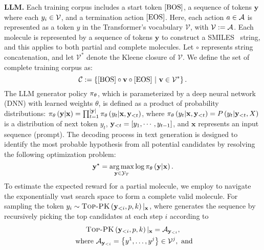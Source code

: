 {

\textbf{LLM.}
Each training corpus includes a start token $\left[\text{BOS}\right]$, a sequence of tokens $\mathbf{y}$ where each $y_i \in \mathcal{V}$, and a termination action $\left[\text{EOS}\right]$. Here, each action $a \in \mathcal{A}$ is represented as a token $y$ in the Transformer's vocabulary $\mathcal{V}$, with $\mathcal{V} := \mathcal{A}$. Each molecule is represented by a sequence of tokens $\mathbf{y}$ to construct a SMILES~\citep{weininger1988smiles} string, and this applies to both partial and complete molecules.
Let  $\circ$ represents string concatenation, and let $\mathcal{V}^*$ denote the Kleene closure of $\mathcal{V}$.
We define the set of complete training corpus as: 
\begin{equation}
    \mathcal{C} := \left\{\text{[BOS]} \circ \mathbf{v} \circ \text{[EOS]}~|~\mathbf{v}\in \mathcal{V}^*\right\}.
\end{equation}
The LLM generator policy $\pi_{\theta}$, which is parameterized by a deep neural network (DNN) with learned weights $\theta$, is defined as a product of probability distributions:
$\pi_{\theta} \left( {\mathbf{y}|\mathbf{x}} \right) =\prod_{t=1}^{|\mathbf{y}|} \pi_{\theta} \left( {y_t|\mathbf{x},\mathbf{y}_{<t}} \right) $, where  $\pi_{\theta} \left( {y_t|\mathbf{x},\mathbf{y}_{<t}} \right) =P \left( {y_{t}|\mathbf{y}_{<t},X} \right) $ is a distribution of next token $y_t$, $\mathbf{y}_{<t} = \left[y_1, \cdots, y_{t-1}\right]$, and $\mathbf{x}$ represents an input sequence (prompt).
The decoding process in text generation is designed to identify the most probable hypothesis from all potential candidates by resolving the following optimization problem:
\begin{equation}
\mathbf{y}^{\star}=\mathop{\rm arg\,max}_{\mathbf{y}\in \mathcal{Y}_{T}} \log \pi_{\theta} \left( {\mathbf{y}|\mathbf{x}} \right) . 
\end{equation}
{To estimate the expected reward for a partial molecule, we employ 
\TOPPK \citep{liu2024erp} to navigate the exponentially vast search space to form a complete valid molecule}.
For sampling the token $y_i\sim\textsc{Top-PK} \left( {\mathbf{y}_{<i},p,k} \right) |_{\mathbf{x}}$,
where
\TOPPK 
generates the sequence by recursively picking the top candidates at each step $i$ according to 
\begin{gather}\label{eq:toppk}
    \text{\TOPPK}\paren{\mathbf{y}_{<i}, p,k}|_{\mathbf{x}}= \actionSpace_{\mathbf{y}_{<i}},\\
    \text{~where~} \actionSpace_{\mathbf{y}_{<i}}=\curlybracket{y^1,\ldots,y^{j}} \in \mathcal{V}^j, \text{~and}\\ \notag

\end{gather}}

